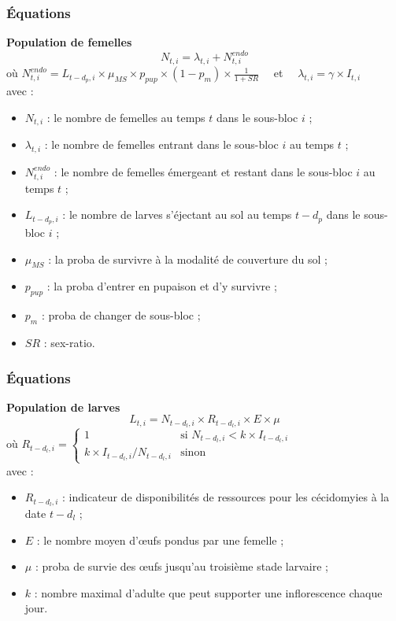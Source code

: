 \documentclass[11pt, a4paper]{beamer}
\newcommand{\1}{\mbox{\textbf{1}}}
\begin{document}
\begin{frame}
\frametitle{Équations}
\footnotesize
\textbf{Population de femelles}
    \[N_{t,i} = \lambda_{t,i} + N_{t,i}^{{endo}}
    \]
    où $N_{t,i}^{{endo}} = L_{t-d_p, i}\times \mu_{MS} \times p_{pup}\times (1 - p_m) \times \frac{1}{1+SR}\quad$  et $\quad \lambda_{t,i} = \gamma \times I_{t,i}$          \\
    avec : \begin{itemize}
            \item $N_{t,i}$ : le nombre de femelles au temps $t$ dans le sous-bloc $i$ ;
            \item $\lambda_{t,i}$ : le nombre de femelles entrant dans le sous-bloc $i$ au temps $t$ ;
            \item $N_{t,i}^{{endo}}$ : le nombre de femelles émergeant et restant dans le sous-bloc $i$ au temps $t$ ;
            \item $L_{t-d_p, i}$ : le nombre de larves s'éjectant au sol au temps $t-d_p$ dans le sous-bloc $i$ ;
            \item $\mu_{MS}$ : la proba de survivre à la modalité de couverture du sol ;
            \item $p_{pup}$ : la proba d'entrer en pupaison et d'y survivre ;
            \item $p_m$ : proba de changer de sous-bloc ;
            \item $SR$ : sex-ratio.
           \end{itemize}

\end{frame}

\begin{frame}
\frametitle{Équations}
\footnotesize
\textbf{Population de larves}
    \[L_{t,i} = N_{t-d_l, i} \times R_{t-d_l, i} \times E \times \mu
    \]
    où $R_{t-d_l, i} = \begin{cases}
                        1 & \mbox{si } N_{t-d_l, i} < k\times I_{t-d_l, i}\\
                        k\times I_{t-d_l, i}/N_{t-d_l, i} & \mbox{sinon}
                       \end{cases}
$           \\
    avec : \begin{itemize}
            \item $R_{t-d_l, i}$ : indicateur de disponibilités de ressources pour les cécidomyies à la date $t-d_l$  ;
            \item $E$ : le nombre moyen d'œufs pondus par une femelle ;
            \item $\mu$ : proba de survie des œufs jusqu'au troisième stade larvaire ;
            \item $k$ : nombre maximal d'adulte que peut supporter une inflorescence chaque jour.
           \end{itemize}

\end{frame}
\end{document}
